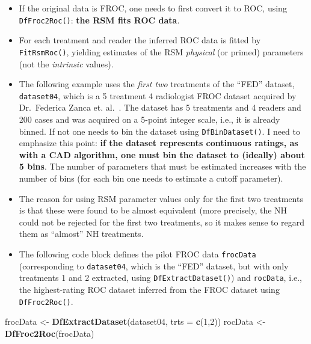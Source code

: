 \documentclass[
]{book}
\newenvironment{Shaded}{\begin{snugshade}}{\end{snugshade}}
\newcommand{\DataTypeTok}[1]{\textcolor[rgb]{0.13,0.29,0.53}{#1}}
\newcommand{\DecValTok}[1]{\textcolor[rgb]{0.00,0.00,0.81}{#1}}
\newcommand{\KeywordTok}[1]{\textcolor[rgb]{0.13,0.29,0.53}{\textbf{#1}}}
\newcommand{\NormalTok}[1]{#1}
\newcommand{\StringTok}[1]{\textcolor[rgb]{0.31,0.60,0.02}{#1}}
\begin{document}
\begin{itemize}
\item
  If the original data is FROC, one needs to first convert it to ROC, using \texttt{DfFroc2Roc()}: \textbf{the RSM fits ROC data}.
\item
  For each treatment and reader the inferred ROC data is fitted by \texttt{FitRsmRoc()}, yielding estimates of the RSM \emph{physical} (or primed) parameters (not the \emph{intrinsic} values).
\item
  The following example uses the \emph{first two} treatments of the ``FED'' dataset, \texttt{dataset04}, which is a 5 treatment 4 radiologist FROC dataset acquired by Dr.~Federica Zanca et. al.~\citep{RN1882}. The dataset has 5 treatments and 4 readers and 200 cases and was acquired on a 5-point integer scale, i.e., it is already binned. If not one needs to bin the dataset using \texttt{DfBinDataset()}. I need to emphasize this point: \textbf{if the dataset represents continuous ratings, as with a CAD algorithm, one must bin the dataset to (ideally) about 5 bins}. The number of parameters that must be estimated increases with the number of bins (for each bin one needs to estimate a cutoff parameter).
\item
  The reason for using RSM parameter values only for the first two treatments is that these were found \citep{RN1882} to be almost equivalent (more precisely, the NH could not be rejected for the first two treatments, so it makes sense to regard them as ``almost'' NH treatments.
\item
  The following code block defines the pilot FROC data \texttt{frocData} (corresponding to \texttt{dataset04}, which is the ``FED'' dataset, but with only treatments 1 and 2 extracted, using \texttt{DfExtractDataset()}) and \texttt{rocData}, i.e., the highest-rating ROC dataset inferred from the FROC dataset using \texttt{DfFroc2Roc()}.
\end{itemize}

\begin{Shaded}
\begin{Highlighting}[]
\NormalTok{frocData \textless{}{-}}\StringTok{ }\KeywordTok{DfExtractDataset}\NormalTok{(dataset04, }\DataTypeTok{trts =} \KeywordTok{c}\NormalTok{(}\DecValTok{1}\NormalTok{,}\DecValTok{2}\NormalTok{))}
\NormalTok{rocData \textless{}{-}}\StringTok{ }\KeywordTok{DfFroc2Roc}\NormalTok{(frocData)}
\end{Highlighting}
\end{Shaded}
\end{document}
